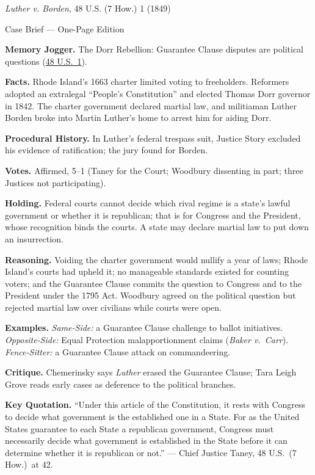 \documentclass[12pt]{article}
\begin{document}
\begin{center}
{\Large \textit{Luther v. Borden}, 48 U.S. (7 How.) 1 (1849)\par}
\vspace{0.3em}
{\normalsize Case Brief --- One-Page Edition\par}
\end{center}

\textbf{Memory Jogger.} The Dorr Rebellion: Guarantee Clause disputes are political questions (\href{https://supreme.justia.com/cases/federal/us/48/1/}{48 U.S.\ 1}).

\textbf{Facts.} Rhode Island's 1663 charter limited voting to freeholders. Reformers adopted an extralegal ``People's Constitution'' and elected Thomas Dorr governor in 1842. The charter government declared martial law, and militiaman Luther Borden broke into Martin Luther's home to arrest him for aiding Dorr.

\textbf{Procedural History.} In Luther's federal trespass suit, Justice Story excluded his evidence of ratification; the jury found for Borden.

\textbf{Votes.} Affirmed, 5--1 (Taney for the Court; Woodbury dissenting in part; three Justices not participating).

\textbf{Holding.} Federal courts cannot decide which rival regime is a state's lawful government or whether it is republican; that is for Congress and the President, whose recognition binds the courts. A state may declare martial law to put down an insurrection.

\textbf{Reasoning.} Voiding the charter government would nullify a year of laws; Rhode Island's courts had upheld it; no manageable standards existed for counting voters; and the Guarantee Clause commits the question to Congress and to the President under the 1795 Act. Woodbury agreed on the political question but rejected martial law over civilians while courts were open.

\textbf{Examples.} \emph{Same-Side:} a Guarantee Clause challenge to ballot initiatives. \emph{Opposite-Side:} Equal Protection malapportionment claims (\textit{Baker v.\ Carr}). \emph{Fence-Sitter:} a Guarantee Clause attack on commandeering.

\textbf{Critique.} Chemerinsky says \textit{Luther} erased the Guarantee Clause; Tara Leigh Grove reads early cases as deference to the political branches.

\textbf{Key Quotation.} ``Under this article of the Constitution, it rests with Congress to decide what government is the established one in a State. For as the United States guarantee to each State a republican government, Congress must necessarily decide what government is established in the State before it can determine whether it is republican or not.'' --- Chief Justice Taney, 48 U.S.\ (7 How.)\ at 42.
\end{document}
